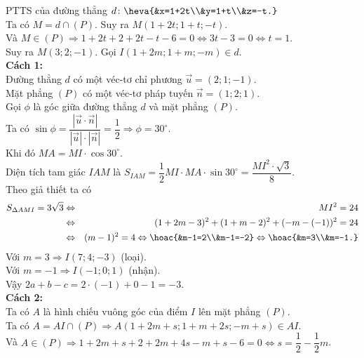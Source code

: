 \begin{ex}
{\begin{center}
\begin{tikzpicture}[line cap=round,line join=round,font=\footnotesize,>=stealth,scale=.8]
			\end{tikzpicture}
		\end{center}
		PTTS của đường thẳng $d\colon \heva{&x=1+2t\\&y=1+t\\&z=-t.}$\\
		Ta có $M=d\cap(P)$. Suy ra $M(1+2t;1+t;-t)$.\\
		Và $M \in(P) \Rightarrow 1+2 t+2+2 t-t-6=0 \Leftrightarrow 3 t-3=0 \Leftrightarrow t=1$.\\
		Suy ra $M(3;2;-1)$.
		Gọi $I(1+2m;1+m;-m) \in d$.\\
		{\bf Cách 1:}\\
		Đường thẳng $d$ có một véc-tơ chỉ phương $\overrightarrow{u}=(2;1;-1)$.\\
		Mặt phẳng $(P)$ có một véc-tơ pháp tuyến $\overrightarrow{n}=(1;2;1)$.\\
		Gọi $\phi$ là góc giữa đường thẳng $ d $ và mặt phẳng $(P)$.\\
		Ta có $\sin \phi =\dfrac{\left|\overrightarrow{u}\cdot \overrightarrow{n} \right|}{\left|\overrightarrow{u} \right|\cdot \left| \overrightarrow{n} \right|} =\dfrac{1}{2}\Rightarrow \phi=30^{\circ} $.\\
		Khi đó $ MA=MI \cdot \cos 30^{\circ} $.\\
		Diện tích tam giác $IAM$ là $S_{IAM}=\dfrac{1}{2}MI \cdot MA\cdot\sin {30^\circ}=\dfrac{MI^2\cdot \sqrt{3}}{8}$.\\
		Theo giả thiết ta có
		\allowdisplaybreaks
		\begin{eqnarray*}
			S_{\Delta AMI}=3\sqrt{3} &\Leftrightarrow& MI^2=24\\
			&\Leftrightarrow&(1+2m-3)^2+(1+m-2)^2+(-m-(-1))^2=24\\
			&\Leftrightarrow&  (m-1)^2=4 \Leftrightarrow\hoac{&m-1=2\\&m-1=-2} \Leftrightarrow \hoac{&m=3\\&m=-1.}
		\end{eqnarray*}
		Với $m=3 \Rightarrow I(7;4;-3)$ (loại).\\
		Với $m=-1 \Rightarrow I(-1;0;1)$ (nhận).\\
		Vậy $2 a+b-c=2 \cdot(-1)+0-1=-3$.\\
		{\bf Cách 2:}\\
		Ta có $A$ là hình chiếu vuông góc của điểm $I$ lên mặt phẳng $(P)$.\\
		Ta có $A=A I \cap(P) \Rightarrow A(1+2 m+s;1+m+2s;-m+s) \in A I$.\\
		Và $A \in(P) \Rightarrow 1+2 m+s+2+2 m+4 s-m+s-6=0 \Leftrightarrow s=\dfrac{1}{2}-\dfrac{1}{2} m$.\\
}
\end{ex}
